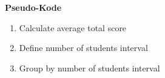\textbf{Pseudo-Kode}
\begin{enumerate}
  \item Calculate average total score
  \item Define number of students interval
  \item Group by number of students interval
\end{enumerate}